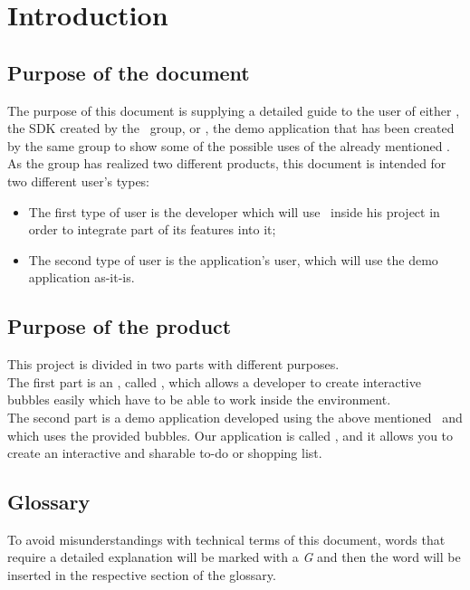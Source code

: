 \section{Introduction}

\subsection{Purpose of the document}
The purpose of this document is supplying a detailed guide to the user of either \progettoShort, the SDK created by the \gruppo\ group, or \app, the demo application that has been created by the same group to show some of the possible uses of the already mentioned . \\
As the group has realized two different products, this document is intended for two different user's types:
\begin{itemize}
	\item The first type of user is the developer which will use \progettoShort\ inside his  project in order to integrate part of its features into it;
	\item The second type of user is the application's user, which will use the demo application as-it-is.
\end{itemize}

\subsection{Purpose of the product}
This project is divided in two parts with different purposes. \\
The first part is an , called \progettoShort, which allows a developer to create interactive bubbles easily which have to be able to work inside the  environment. \\
The second part is a demo application developed using the above mentioned \progettoShort\ and which uses the provided bubbles. Our application is called \app, and it allows you to create an interactive and sharable to-do or shopping list.

\subsection{Glossary}
To avoid misunderstandings with technical terms of this document, words that require a detailed explanation will be marked with a \textit{G} and then the word will be inserted in the respective section of the glossary.

\newpage